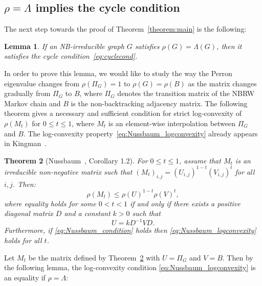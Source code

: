\documentclass{article}
\newtheorem{theorem}{Theorem}
\newtheorem{lemma}[theorem]{Lemma}
\begin{document}
\subsection{$\rho = \Lambda$ implies the cycle condition}\label{subsect:equality_implies_cycle}
The next step towards the proof of Theorem~\ref{theorem:main} is the following:
\begin{lemma}\label{lemma:rho_eq_Lambda_implies_cycle}
    If an NB-irreducible graph $G$
    satisfies $\rho(G) = \Lambda(G)$, then it satisfies the cycle condition~\eqref{eq:cyclecond}.
\end{lemma}

In order to prove this lemma,
we would like to study the way the Perron eigenvalue changes from $\rho(\Pi_G)=1$ to $\rho(G)=\rho(B)$
as the matrix changes gradually from $\Pi_G$ to $B$, 
where $\Pi_G$ denotes the transition matrix of the NBRW Markov chain and $B$ is the non-backtracking adjacency matrix.
The following theorem gives a necessary and sufficient condition for strict log-convexity of $\rho(M_t)$ for $0 \leq t \leq 1$, 
where $M_t$ is an element-wise interpolation between $\Pi_G$ and $B$. The log-convexity property~\eqref{eq:Nussbaum_logconvexity} already appears in Kingman~\cite{kingman1961convexity}.

\begin{theorem}[Nussbaum~\cite{nussbaum1986convexity}, Corollary 1.2]\label{theorem:Nussbaum}
    For $0 \leq t \leq 1$, assume that $M_t$ is an irreducible non-negative matrix such that $(M_t)_{i,j} = (U_{i,j})^{1-t} (V_{i,j})^t$ for all $i,j$.
    Then:
    \begin{equation}\label{eq:Nussbaum_logconvexity}
        \rho(M_t) \leq \rho(U)^{1-t} \rho(V)^t,
    \end{equation}
    where equality holds for some $0 < t <1$ 
    if and only if there exists a positive diagonal matrix $D$ and a constant $k > 0$ such that
    \begin{equation}\label{eq:Nussbaum_condition}
        U = k D^{-1} V D.
    \end{equation}
    Furthermore, if \eqref{eq:Nussbaum_condition} holds then \eqref{eq:Nussbaum_logconvexity} holds for all $t$.
\end{theorem}

Let $M_t$ be the matrix defined by Theorem~\ref{theorem:Nussbaum} with $U = \Pi_G$ and $V = B$.
Then by the following lemma, the log-convexity condition \eqref{eq:Nussbaum_logconvexity} is an equality if $\rho=\Lambda$:
\end{document}
